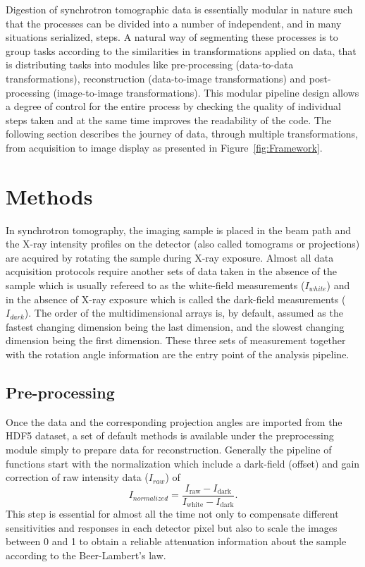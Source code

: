 \documentclass[pdf]{iucr}              %
\begin{document}
Digestion of synchrotron tomographic data is essentially modular in nature such that the processes can be divided into a number of independent, and in many situations serialized, steps. A natural way of segmenting these processes is to group tasks according to the similarities in transformations applied on data, that is distributing tasks into modules like pre-processing (data-to-data transformations), reconstruction (data-to-image transformations) and post-processing (image-to-image transformations). This modular pipeline design allows a degree of control for the entire process by checking the quality of individual steps taken and at the same time improves the readability of the code. The following section describes the journey of data, through multiple transformations, from acquisition to image display as presented in Figure~\ref{fig:Framework}.

\section{Methods} 

In synchrotron tomography, the imaging sample is placed in the beam path and the X-ray intensity profiles on the detector (also called tomograms or projections) are acquired by rotating the sample during X-ray exposure. Almost all data acquisition protocols require another sets of data taken in the absence of the sample which is usually refereed to as the white-field measurements ($I_{white}$) and in the absence of X-ray exposure which is called the dark-field measurements ($I_{dark}$). The order of the multidimensional arrays is, by default, assumed as the fastest changing dimension being the last dimension, and the slowest changing dimension being the first dimension. These three sets of measurement together with the rotation angle information are the entry point of the analysis pipeline.

\subsection{Pre-processing} 

Once the data and the corresponding projection angles are imported from the HDF5 dataset, a set of default methods is available under the preprocessing module simply to prepare data for reconstruction. Generally the pipeline of functions start with the normalization which include a dark-field (offset) and gain correction of raw intensity data ($I_{raw}$) of
\begin{equation}
I_{normalized}=\frac{I_{\mbox{raw}}-I_{\mbox{dark}}}{I_{\mbox{white}}-I_{\mbox{dark}}}.
\end{equation}
This step is essential for almost all the time not only to compensate different sensitivities and responses in each detector pixel but also to scale the images between 0 and 1 to obtain a reliable attenuation information about the sample according to the Beer-Lambert's law. 
\end{document}
